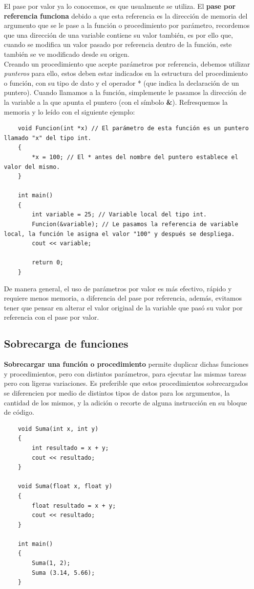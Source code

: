 El pase por valor ya lo conocemos, es que usualmente se utiliza. El \textbf{pase por referencia funciona} debido a que esta referencia es la dirección de memoria del argumento que se le pase a la función o procedimiento por parámetro, recordemos que una dirección de una variable contiene su valor también, es por ello que, cuando se modifica un valor pasado por referencia dentro de la función, este también se ve modificado desde su origen.\\
Creando un procedimiento que acepte parámetros por referencia, debemos utilizar \textit{punteros} para ello, estos deben estar indicados en la estructura del procedimiento o función, con su tipo de dato y el operador * (que indica la declaración de un puntero). Cuando llamamos a la función, simplemente le pasamos la dirección de la variable a la que apunta el puntero (con el símbolo \textbf{\&}). Refresquemos la memoria y lo leído con el siguiente ejemplo:
\begin{lstlisting}
    void Funcion(int *x) // El parámetro de esta función es un puntero llamado "x" del tipo int.
    {
        *x = 100; // El * antes del nombre del puntero establece el valor del mismo.
    }
    
    int main()
    {
        int variable = 25; // Variable local del tipo int.
        Funcion(&variable); // Le pasamos la referencia de variable local, la función le asigna el valor "100" y después se despliega.
        cout << variable;
    
        return 0;
    }
\end{lstlisting}

De manera general, el uso de parámetros por valor es más efectivo, rápido y requiere menos memoria, a diferencia del pase por referencia, además, evitamos tener que pensar en alterar el valor original de la variable que pasó su valor por referencia con el pase por valor.


\subsection{Sobrecarga de funciones}
\hspace{0.55cm}\textbf{Sobrecargar una función o procedimiento} permite duplicar dichas funciones y procedimientos, pero con distintos parámetros, para ejecutar las mismas tareas pero con ligeras variaciones. Es preferible que estos procedimientos sobrecargados se diferencien por medio de distintos tipos de datos para los argumentos, la cantidad de los mismos, y la adición o recorte de alguna instrucción en su bloque de código.
\begin{lstlisting}
    void Suma(int x, int y)
    {
        int resultado = x + y;
        cout << resultado;
    }
    
    void Suma(float x, float y)
    {
        float resultado = x + y;
        cout << resultado;
    }

    int main()
    {
        Suma(1, 2);
        Suma (3.14, 5.66);
    }
\end{lstlisting}

